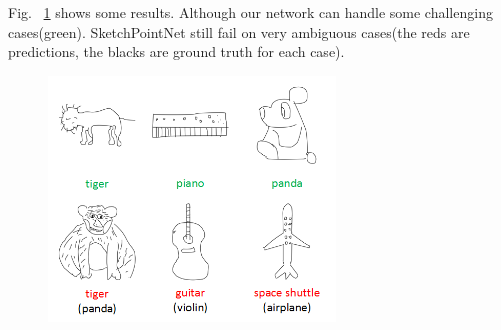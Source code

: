 Fig. ~\ref{fig:resshow} shows some results. Although our network can handle some challenging cases(green). SketchPointNet still fail on very ambiguous cases(the reds are predictions, the blacks are ground truth for each case).

\begin{figure}[htbp]
    \center
    \includegraphics[width=3in]{images/res.png}
    \label{fig:resshow}
\end{figure}
